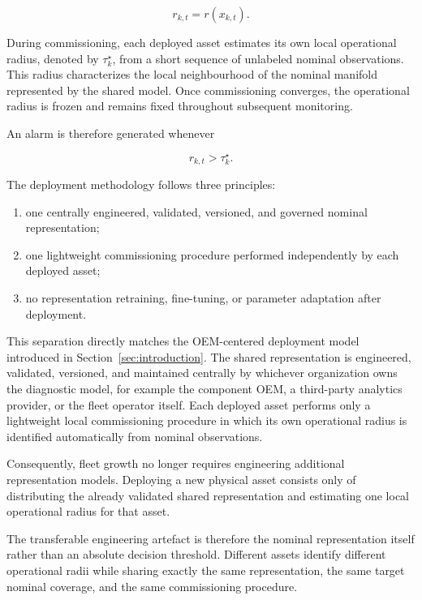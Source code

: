 \documentclass{trbunofficial}
\begin{document}
\begin{equation}
r_{k,t}=r(x_{k,t}).
\label{eq:score}
\end{equation}

During commissioning, each deployed asset estimates its own local
operational radius, denoted by $\tau_k^\star$, from a short sequence of
unlabeled nominal observations. This radius characterizes the local
neighbourhood of the nominal manifold represented by the shared model.
Once commissioning converges, the operational radius is frozen and remains
fixed throughout subsequent monitoring.

An alarm is therefore generated whenever

\begin{equation}
r_{k,t}>\tau_k^\star.
\label{eq:decision}
\end{equation}

The deployment methodology follows three principles:

\begin{enumerate}[leftmargin=1.5em]
\item one centrally engineered, validated, versioned, and governed nominal representation;
\item one lightweight commissioning procedure performed independently by each deployed asset;
\item no representation retraining, fine-tuning, or parameter adaptation after deployment.
\end{enumerate}

This separation directly matches the OEM-centered deployment model introduced
in Section~\ref{sec:introduction}. The shared representation is engineered,
validated, versioned, and maintained centrally by whichever organization
owns the diagnostic model, for example the component OEM, a third-party
analytics provider, or the fleet operator itself. Each deployed asset
performs only a lightweight local commissioning procedure in which its own
operational radius is identified automatically from nominal observations.

Consequently, fleet growth no longer requires engineering additional
representation models. Deploying a new physical asset consists only of
distributing the already validated shared representation and estimating one
local operational radius for that asset.

The transferable engineering artefact is therefore the nominal
representation itself rather than an absolute decision threshold.
Different assets identify different operational radii while sharing exactly
the same representation, the same target nominal coverage, and the same
commissioning procedure.
\end{document}
